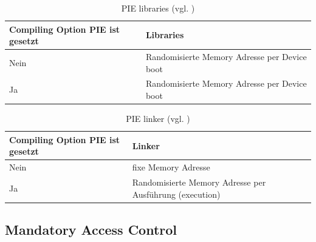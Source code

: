 \begin{table}
    \begin{center}
      \begin{tabular}{|p{6cm}|p{9cm}|} \hline
            Compiling Option PIE ist gesetzt & Libraries \\ \hline
            Nein & Randomisierte Memory Adresse per Device boot\\ \hline
            Ja & Randomisierte Memory Adresse per Device boot \\ \hline
        \end{tabular}
        \caption{PIE libraries (vgl. \cite{iOSSec[5]})}
       \label{tab:PIE libraries}
    \end{center}
\end{table}

 \begin{table}
    \begin{center}
        \begin{tabular}{|p{6cm}|p{9cm}|} \hline
            Compiling Option PIE ist gesetzt & Linker  \\ \hline
            Nein & fixe Memory Adresse\\ \hline
            Ja & Randomisierte Memory Adresse per Ausführung (execution)\\ \hline
        \end{tabular}
        \caption{PIE linker (vgl. \cite{iOSSec[5]})}
       \label{tab:PIE linker }
    \end{center}
\end{table}

\subsection{Mandatory Access Control}
\label{sec:MAC}

